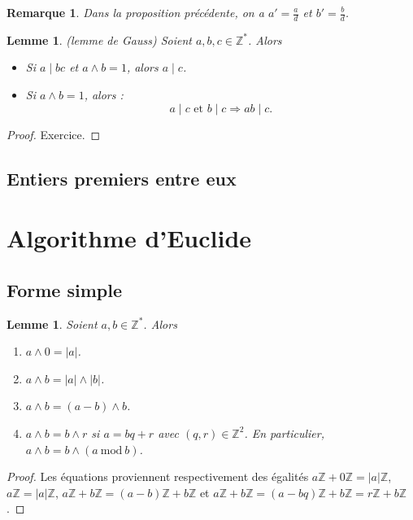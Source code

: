 \documentclass[10pt,a4paper]{report}
\newtheorem*{rem}{Remarque}
\newtheorem{Lem}[thm]{Lemme}
\newcommand{\Z}{\mathbb{Z}}
\begin{document}
\begin{rem}
Dans la proposition précédente, on a $a'=\frac{a}{d}$ et $b'=\frac{b}{d}$.
\end{rem}


\begin{Lem}\label{lem_Gauss}(lemme de Gauss) Soient $a,b,c \in \mathbb{Z}^*$. Alors
\begin{itemize}
\item[$1)$] Si $a\mid bc$ et $a \wedge b=1$, alors $a \mid c$.
\item[$2)$] Si $a \wedge b=1$, alors :\[a \mid c \text{ et }b \mid c  \Rightarrow ab \mid c.\] 
\end{itemize}
\end{Lem}

\begin{proof}
Exercice.
\end{proof}



\subsection{Entiers premiers entre eux}



\section{Algorithme d'Euclide}

\subsection{Forme simple}






\begin{Lem}\label{lemEuclide}
Soient $a,b \in \mathbb{Z}^* $. Alors
\begin{enumerate}

\item  $a\wedge 0=|a|$.
\item $a\wedge b=|a|\wedge|b|$.
\item $a\wedge b=(a-b)\wedge b$.
\item $a \wedge b=b\wedge r$ si $a=bq+r$ avec $(q,r)\in \mathbb{Z}^2$. En particulier, $a\wedge b=b\wedge( a\mathrm{\ mod\ }b)$.
\end{enumerate}
\end{Lem}

\begin{proof}
Les équations proviennent respectivement des égalités $a\Z+0\Z=|a|\Z$,  $a \mathbb{Z}=|a| \mathbb{Z}$, $a \mathbb{Z}+b \mathbb{Z}=(a-b)\mathbb{Z}+b\mathbb{Z}$ et $a\mathbb{Z}+b\mathbb{Z}=(a-bq)\mathbb{Z}+b\mathbb{Z}=r\mathbb{Z}+b\mathbb{Z}$.
\end{proof}
\end{document}
